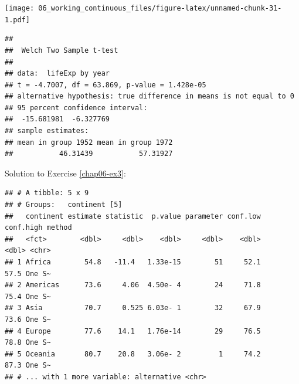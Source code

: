 \documentclass[
  12pt,
  krantz2]{krantz}
\makeatletter
\newenvironment{Shaded}{\begin{snugshade}}{\end{snugshade}}
\newcommand{\CommentTok}[1]{\textcolor[rgb]{0.56,0.35,0.01}{\textit{#1}}}
\newcommand{\DataTypeTok}[1]{\textcolor[rgb]{0.13,0.29,0.53}{#1}}
\newcommand{\DecValTok}[1]{\textcolor[rgb]{0.00,0.00,0.81}{#1}}
\newcommand{\KeywordTok}[1]{\textcolor[rgb]{0.13,0.29,0.53}{\textbf{#1}}}
\newcommand{\NormalTok}[1]{#1}
\newcommand{\OperatorTok}[1]{\textcolor[rgb]{0.81,0.36,0.00}{\textbf{#1}}}
\newcommand{\StringTok}[1]{\textcolor[rgb]{0.31,0.60,0.02}{#1}}
\newenvironment{kframe}{%
\medskip{}
\setlength{\fboxsep}{.8em}
 \def\at@end@of@kframe{}%
 \ifinner\ifhmode%
  \def\at@end@of@kframe{\end{minipage}}%
  \begin{minipage}{\columnwidth}%
 \fi\fi%
 \def\FrameCommand##1{\hskip\@totalleftmargin \hskip-\fboxsep
 \colorbox{shadecolor}{##1}\hskip-\fboxsep
     \hskip-\linewidth \hskip-\@totalleftmargin \hskip\columnwidth}%
 \MakeFramed {\advance\hsize-\width
   \@totalleftmargin\z@ \linewidth\hsize
   \@setminipage}}%
 {\par\unskip\endMakeFramed%
 \at@end@of@kframe}
\renewenvironment{Shaded}{\begin{kframe}}{\end{kframe}}
\makeatother
\begin{document}
\texttt{[image: 06\_working\_continuous\_files/figure-latex/unnamed-chunk-31-1.pdf]}

\begin{Shaded}
\end{Shaded}

\begin{verbatim}
## 
##  Welch Two Sample t-test
## 
## data:  lifeExp by year
## t = -4.7007, df = 63.869, p-value = 1.428e-05
## alternative hypothesis: true difference in means is not equal to 0
## 95 percent confidence interval:
##  -15.681981  -6.327769
## sample estimates:
## mean in group 1952 mean in group 1972 
##           46.31439           57.31927
\end{verbatim}

Solution to Exercise \ref{chap06-ex3}:

\begin{Shaded}
\end{Shaded}

\begin{verbatim}
## # A tibble: 5 x 9
## # Groups:   continent [5]
##   continent estimate statistic  p.value parameter conf.low conf.high method
##   <fct>        <dbl>     <dbl>    <dbl>     <dbl>    <dbl>     <dbl> <chr> 
## 1 Africa        54.8   -11.4   1.33e-15        51     52.1      57.5 One S~
## 2 Americas      73.6     4.06  4.50e- 4        24     71.8      75.4 One S~
## 3 Asia          70.7     0.525 6.03e- 1        32     67.9      73.6 One S~
## 4 Europe        77.6    14.1   1.76e-14        29     76.5      78.8 One S~
## 5 Oceania       80.7    20.8   3.06e- 2         1     74.2      87.3 One S~
## # ... with 1 more variable: alternative <chr>
\end{verbatim}
\end{document}

